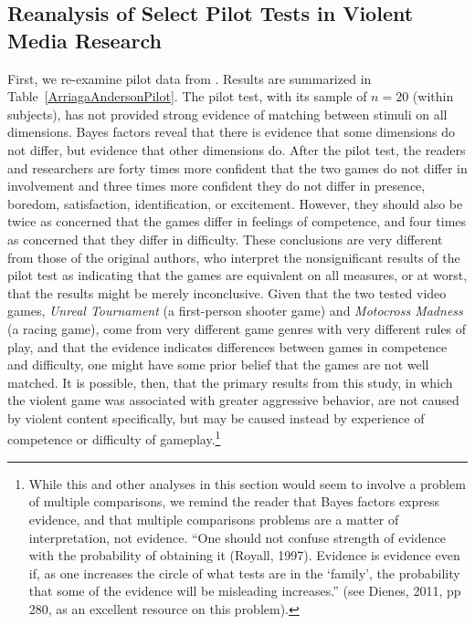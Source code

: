 \documentclass[man]{apa6}
\begin{document}
\subsection{Reanalysis of Select Pilot Tests in Violent Media Research}
First, we re-examine pilot data from \citet{Arriaga:etal:2008}. Results are summarized in Table~\ref{ArriagaAndersonPilot}. The pilot test, with its sample of $n = 20$ (within subjects), has not provided strong evidence of matching between stimuli on all dimensions. Bayes factors reveal that there is evidence that some dimensions do not differ, but evidence that other dimensions do. After the pilot test, the readers and researchers %
are forty times more confident that the two games do not differ in involvement and three times more confident they do not differ in presence, boredom, satisfaction, identification, or excitement. However, they should also be twice as concerned that the games differ in feelings of competence, and four times as concerned that they differ in difficulty. These conclusions are very different from those of the original authors, who interpret the nonsignificant results of the pilot test as indicating that the games are equivalent on all measures, or at worst, that the results might be merely inconclusive. Given that the two tested video games, {\em Unreal Tournament} (a first-person shooter game) and {\em Motocross Madness} (a racing game), come from very different game genres with very different rules of play, and that the evidence indicates differences between games in competence and difficulty, one might have some prior belief that the games are not well matched.  It is possible, then, that the primary results from this study, in which the violent game was associated with greater aggressive behavior, %
are not caused by violent content specifically, but may be caused instead by experience of competence or difficulty of gameplay.\footnote{While this and other analyses in this section would seem to involve a problem of multiple comparisons, we remind the reader that Bayes factors express evidence, and that multiple comparisons problems are a matter of interpretation, not evidence. ``One should not confuse strength of evidence with the probability of obtaining it (Royall, 1997). Evidence is evidence even if, as one increases the circle of what tests are in the `family', the probability that some of the evidence will be misleading increases.'' (see Dienes, 2011, pp 280, as an excellent resource on this problem).}
\end{document}
